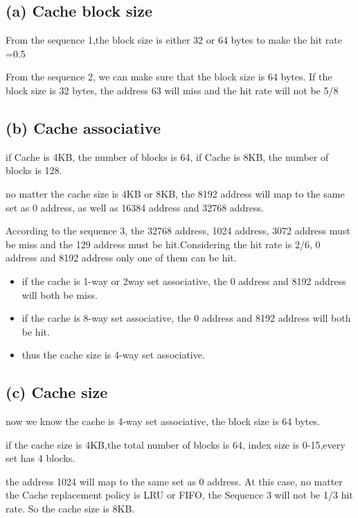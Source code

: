 \documentclass[cn,12pt]{homework}
\begin{document}
\begin{solution}
  

\subsection*{(a) Cache block size}

From the sequence 1,the block size is either 32 or 64 bytes to make the hit rate =0.5

From the sequence 2, we can make sure that the block size is 64 bytes. If the block size is 32 bytes, the address
63 will miss and the hit rate will not be 5/8

\subsection*{(b) Cache associative}
if Cache is 4KB, the number of blocks is 64, if Cache is 8KB, the number of blocks is 128.

no matter the cache size is 4KB or 8KB, the 8192 address will map to the same set as 0 address, as well as 
16384 address and 32768 address. 

According to the sequence 3, the 32768 address, 1024 address, 3072 address must be miss
and the 129 address must be hit.Considering the hit rate is 2/6, 0 address and 8192 address only one of them can be hit.

\begin{itemize}
  \item if the cache is 1-way or 2way set associative, the 0 address and 8192 address will both be miss.
  \item if the cache is 8-way set associative, the 0 address and 8192 address will both be hit.
  \item thus the cache size is 4-way set associative.
\end{itemize}

\subsection*{(c) Cache size}
now we know the cache is 4-way set associative, the block size is 64 bytes.

if the cache size is 4KB,the total number of blocks is 64, index size is 0-15,every set has 4 blocks.

the address 1024 will map to the same set as 0 address. At this case, no matter the Cache replacement policy is LRU or FIFO, 
the Sequence 3 will not be 1/3 hit rate. So the cache size is 8KB.


\end{solution}
\end{document}
